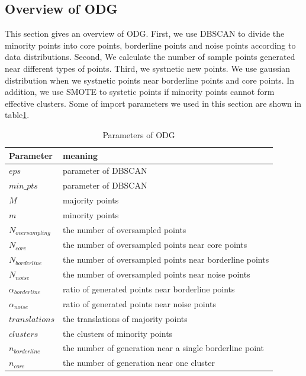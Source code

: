 \documentclass[runningheads]{llncs}
\begin{document}
\subsection{Overview of ODG}
This section gives an overview of ODG. 
First, we use DBSCAN to divide the minority points into core points, 
borderline points and noise points according 
to data distributions. 
Second, We calculate the number of sample points generated near different types of points.
Third, we systnetic new points.
We use gaussian distribution when we systnetic points near borderline points and core points.
In addition, we use SMOTE to systetic points if minority points cannot form effective clusters.
Some of import parameters we used in this section are shown in table\ref{table15}.
\begin{table}[]
  \caption{Parameters of ODG}
  \label{table15}
  \begin{tabular}{ll}
  \hline
  Parameter             & meaning                                                 \\ \hline
  $eps$                 & parameter of DBSCAN                                     \\
  $min\_pts$            & parameter of DBSCAN                                     \\
  $M$                   & majority points                                         \\
  $m$                   & minority points                                         \\
  $N_{oversampling}$    & the number of oversampled points                        \\
  $N_{core}$            & the number of oversampled points near core points       \\
  $N_{borderline}$      & the number of oversampled points near borderline points \\
  $N_{noise}$           & the number of oversampled points near noise points      \\
  $\alpha_{borderline}$ & ratio of generated points near borderline points        \\
  $\alpha_{noise}$      & ratio of generated points near noise points             \\
  $translations$        & the translations of majority points                     \\
  $clusters$            & the clusters of minority points                         \\ 
  $n_{borderline}$      & the number of generation near a single borderline point \\ 
  $n_{core}$            & the number of generation near one cluster               \\ \hline
  \end{tabular}
  \end{table}
\end{document}
